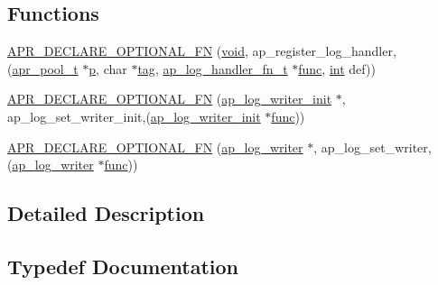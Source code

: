 \subsection*{Functions}
\begin{DoxyCompactItemize}
\item 
\hyperlink{group__MOD__LOG__CONFIG_ga0f1ebe6484bb8736fe4691cd8d938f8d}{A\+P\+R\+\_\+\+D\+E\+C\+L\+A\+R\+E\+\_\+\+O\+P\+T\+I\+O\+N\+A\+L\+\_\+\+FN} (\hyperlink{group__MOD__ISAPI_gacd6cdbf73df3d9eed42fa493d9b621a6}{void}, ap\+\_\+register\+\_\+log\+\_\+handler,(\hyperlink{structapr__pool__t}{apr\+\_\+pool\+\_\+t} $\ast$\hyperlink{group__APACHE__CORE__MPM_ga5cd91701e5c167f2b1a38e70ab57817e}{p}, char $\ast$\hyperlink{group__APACHE__CORE__HTTPD_ga7bb5e40c10df6a41df64bda1f4bb3e26}{tag}, \hyperlink{group__MOD__LOG__CONFIG_ga8b3bfba0c0ad4bfc84f9c730478a38ed}{ap\+\_\+log\+\_\+handler\+\_\+fn\+\_\+t} $\ast$\hyperlink{group__apr__thread__proc_ga40bf04c29bfb67c93dc7dc5075531285}{func}, \hyperlink{pcre_8txt_a42dfa4ff673c82d8efe7144098fbc198}{int} def))
\item 
\hyperlink{group__MOD__LOG__CONFIG_ga3fb97dc6be04b9f3182efacb884682a4}{A\+P\+R\+\_\+\+D\+E\+C\+L\+A\+R\+E\+\_\+\+O\+P\+T\+I\+O\+N\+A\+L\+\_\+\+FN} (\hyperlink{group__MOD__LOG__CONFIG_ga46489570f9a6d3883db0aad3f4ab93b8}{ap\+\_\+log\+\_\+writer\+\_\+init} $\ast$, ap\+\_\+log\+\_\+set\+\_\+writer\+\_\+init,(\hyperlink{group__MOD__LOG__CONFIG_ga46489570f9a6d3883db0aad3f4ab93b8}{ap\+\_\+log\+\_\+writer\+\_\+init} $\ast$\hyperlink{group__apr__thread__proc_ga40bf04c29bfb67c93dc7dc5075531285}{func}))
\item 
\hyperlink{group__MOD__LOG__CONFIG_ga780705d898dd3ab2c56ac94cd23bb24d}{A\+P\+R\+\_\+\+D\+E\+C\+L\+A\+R\+E\+\_\+\+O\+P\+T\+I\+O\+N\+A\+L\+\_\+\+FN} (\hyperlink{group__MOD__LOG__CONFIG_gad20836f7acb84e4b4e8ea3031db5aa68}{ap\+\_\+log\+\_\+writer} $\ast$, ap\+\_\+log\+\_\+set\+\_\+writer,(\hyperlink{group__MOD__LOG__CONFIG_gad20836f7acb84e4b4e8ea3031db5aa68}{ap\+\_\+log\+\_\+writer} $\ast$\hyperlink{group__apr__thread__proc_ga40bf04c29bfb67c93dc7dc5075531285}{func}))
\end{DoxyCompactItemize}


\subsection{Detailed Description}


\subsection{Typedef Documentation}
